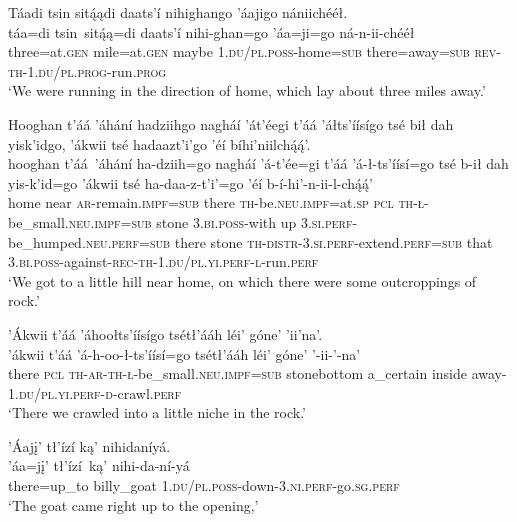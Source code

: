 \ea\label{ex:text6-8-15}
Táadi tsin sitą́ądi daats’í nihighango ’áajigo nániichééł.\\
\gll táa=di	tsin~{sitą́ą=di}	daats’í	nihi-ghan=go	’áa=ji=go	ná-n-ii-chééł\\
     three=at.\textsc{gen}	mile=at.\textsc{gen}	maybe	1.\textsc{du}/\textsc{pl}.\textsc{poss}-home=\textsc{sub}	there=away=\textsc{sub}	\textsc{rev}-\textsc{th}-1.\textsc{du}/\textsc{pl}.\textsc{prog}-run.\textsc{prog}\\
\glt `We were running in the direction of home, which lay about three miles away.'
\z

\ea\label{ex:text6-8-16}
Hooghan t’áá ’áhání hadziihgo nagháí ’át’éegi t’áá ’áłts’íísígo tsé bił dah yisk’idgo, ’ákwii tsé hadaazt’i’go ’éí bíhi’niilchą́ą́’.\\
\gll hooghan	t’áá~{’áhání}	ha-dziih=go	nagháí	’á-t’ée=gi	t’áá	’á-ł-ts’íísí=go	tsé	b-ił	dah	yis-k’id=go	’ákwii	tsé	ha-daa-z-t’i’=go	’éí	b-í-hi’-n-ii-l-chą́ą́’\\
     home	near	\textsc{ar}-remain.\textsc{impf}=\textsc{sub}	there	\textsc{th}-be.\textsc{neu}.\textsc{impf}=at.\textsc{sp}	\textsc{pcl}	\textsc{th}-\textsc{ł}-be\_small.\textsc{neu}.\textsc{impf}=\textsc{sub}	stone	3.\textsc{bi}.\textsc{poss}-with	up	3.\textsc{si}.\textsc{perf}-be\_humped.\textsc{neu}.\textsc{perf}=\textsc{sub}	there	stone	\textsc{th}-\textsc{distr}-3.\textsc{si}.\textsc{perf}-extend.\textsc{perf}=\textsc{sub}	that	3.\textsc{bi}.\textsc{poss}-against-\textsc{rec}-\textsc{th}-1.\textsc{du}/\textsc{pl}.\textsc{yi}.\textsc{perf}-\textsc{l}-run.\textsc{perf}\\
\glt `We got to a little hill near home, on which there were some outcroppings of rock.'
\z

\ea\label{ex:text6-8-17}
’Ákwii t’áá ’áhoołts’íísígo tsétł’ááh léi’ góne’ ’ii’na’.\\
\gll ’ákwii	t’áá	’á-h-oo-ł-ts’íísí=go	tsétł’ááh	léi’	góne’	’-ii-’-na’\\
     there	\textsc{pcl}	\textsc{th}-\textsc{ar}-\textsc{th}-\textsc{ł}-be\_small.\textsc{neu}.\textsc{impf}=\textsc{sub}	stonebottom	a\_certain	inside	away-1.\textsc{du}/\textsc{pl}.\textsc{yi}.\textsc{perf}-\textsc{d}-crawl.\textsc{perf}\\
\glt `There we crawled into a little niche in the rock.'
\z

\ea\label{ex:text6-8-18}
’Áajį’ tł’ízí ką’ nihidaníyá.\\
\gll ’áa=jį’	tł’ízí~{ką’}	nihi-da-ní-yá\\
     there=up\_to	billy\_goat	1.\textsc{du}/\textsc{pl}.\textsc{poss}-down-3.\textsc{ni}.\textsc{perf}-go.\textsc{sg}.\textsc{perf}\\
\glt `The goat came right up to the opening,'
\z

